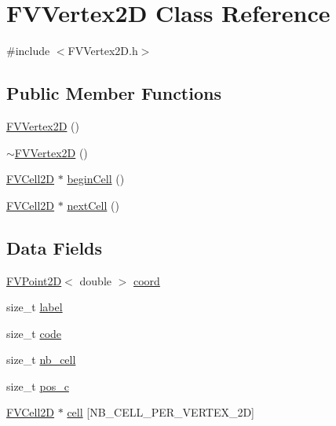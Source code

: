 \hypertarget{classFVVertex2D}{
\section{FVVertex2D Class Reference}
\label{d5/dbb/classFVVertex2D}
}


{\ttfamily \#include $<$FVVertex2D.h$>$}

\subsection*{Public Member Functions}
\begin{DoxyCompactItemize}
\item 
\hyperlink{classFVVertex2D_a9d6a1385efe0320a38bb8e7b5d87f8e4}{FVVertex2D} ()
\item 
\hyperlink{classFVVertex2D_afa2c95179a8d4d9b8e8fdc9b27d820c3}{$\sim$FVVertex2D} ()
\item 
\hyperlink{classFVCell2D}{FVCell2D} $\ast$ \hyperlink{classFVVertex2D_aada085185bbf330d68dca62b7f2eda47}{beginCell} ()
\item 
\hyperlink{classFVCell2D}{FVCell2D} $\ast$ \hyperlink{classFVVertex2D_af234b36adb0327d1f46f5a002f47171d}{nextCell} ()
\end{DoxyCompactItemize}
\subsection*{Data Fields}
\begin{DoxyCompactItemize}
\item 
\hyperlink{classFVPoint2D}{FVPoint2D}$<$ double $>$ \hyperlink{classFVVertex2D_a7df51306f5a4f82e51aec0d168ce5ac2}{coord}
\item 
size\_\-t \hyperlink{classFVVertex2D_a1ec973463c76e6d9e91160720959ad68}{label}
\item 
size\_\-t \hyperlink{classFVVertex2D_acf258c3b3328a96e3ee1e3b875b7874f}{code}
\item 
size\_\-t \hyperlink{classFVVertex2D_a1a5a11cfc8bbaa0cf132759c0382da70}{nb\_\-cell}
\item 
size\_\-t \hyperlink{classFVVertex2D_a4a8207cde821dc3afcfb83f8645d62ef}{pos\_\-c}
\item 
\hyperlink{classFVCell2D}{FVCell2D} $\ast$ \hyperlink{classFVVertex2D_a2e88df41fb480687d9c7ed51db6f0226}{cell} \mbox{[}NB\_\-CELL\_\-PER\_\-VERTEX\_\-2D\mbox{]}
\end{DoxyCompactItemize}


